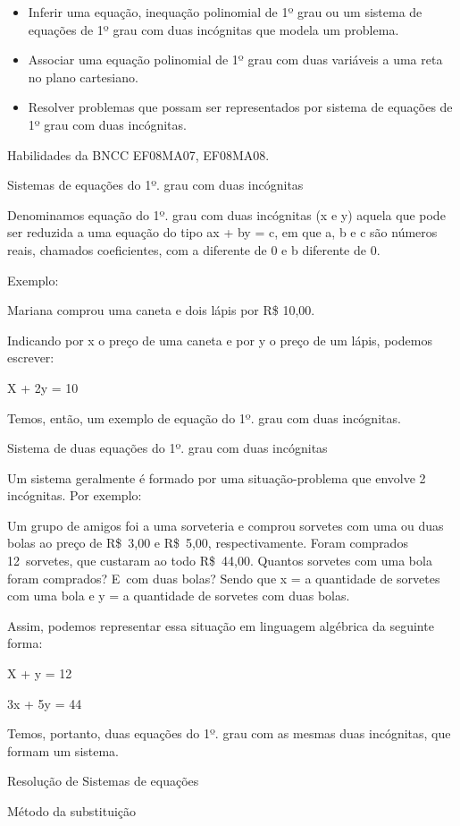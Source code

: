 {\begin{itemize}
\item
  Inferir uma equação, inequação polinomial de 1º grau ou um sistema de
  equações de 1º grau com duas incógnitas que modela um problema.
\item
  Associar uma equação polinomial de 1º grau com duas variáveis a uma
  reta no plano cartesiano.
\item
  Resolver problemas que possam ser representados por sistema de
  equações de 1º grau com duas incógnitas.
\end{itemize}

Habilidades da BNCC EF08MA07, EF08MA08.

Sistemas de equações do 1º. grau com duas incógnitas

Denominamos equação do 1º. grau com duas incógnitas (x e y) aquela que
pode ser reduzida a uma equação do tipo ax + by = c, em que a, b e c são
números reais, chamados coeficientes, com a diferente de 0 e b diferente
de 0.

Exemplo:

Mariana comprou uma caneta e dois lápis por R\$ 10,00.

Indicando por x o preço de uma caneta e por y o preço de um lápis,
podemos escrever:

X + 2y = 10

Temos, então, um exemplo de equação do 1º. grau com duas incógnitas.

Sistema de duas equações do 1º. grau com duas incógnitas

Um sistema geralmente é formado por uma situação-problema que envolve 2
incógnitas. Por exemplo:

Um grupo de amigos foi a uma sorveteria e comprou sorvetes com uma ou
duas bolas ao preço de R\$~3,00 e R\$~5,00, respectivamente. Foram
comprados 12~sorvetes, que custaram ao todo R\$~44,00. Quantos sorvetes
com uma bola foram comprados? E~com duas bolas? Sendo que x = a
quantidade de sorvetes com uma bola e y = a quantidade de sorvetes com
duas bolas.

Assim, podemos representar essa situação em linguagem algébrica da
seguinte forma:

X + y = 12

3x + 5y = 44

Temos, portanto, duas equações do 1º. grau com as mesmas duas
incógnitas, que formam um sistema.

Resolução de Sistemas de equações

Método da substituição

}
